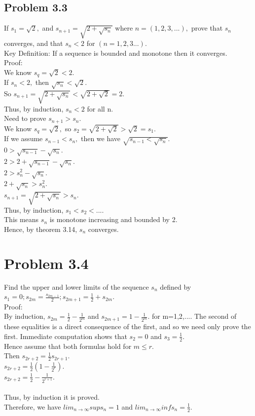 \subsection*{Problem 3.3}
If $s_1=\sqrt{2},$ and $s_{n+1}=\sqrt{2+\sqrt{s_n}}$ where $n=(1,2,3,...),$ prove that ${s_n}$ converges, and that $s_n<2$ for $(n=1,2,3...).$\\ 
Key Definition: If a sequence is bounded and monotone then it converges.\\ 
Proof: \\ 
We know $s_q=\sqrt{2}<2.$\\ 
If $s_n<2,$ then $\sqrt{s_n}<\sqrt{2}.$ \\ 
So $s_{n+1}=\sqrt{2+\sqrt{s_n}}<\sqrt{2+\sqrt{2}}=2.$\\ 
Thus, by induction, $s_n<2$ for all n. \\ 
Need to prove $s_{n+1}>s_n$. \\ 
We know $s_q=\sqrt{2},$ so $s_2=\sqrt{2+\sqrt{2}}>\sqrt{2}=s_1.$\\ 
If we assume $s_{n-1}<s_n,$ then we have $\sqrt{s_{n-1}<\sqrt{s_n}}.$\\ 
$0>\sqrt{s_{n-1}}-\sqrt{s_n}.$\\ $2>2+\sqrt{s_{n-1}}-\sqrt{s_n}.$\\ 
$2>s_{n}^2-\sqrt{s_n}.$\\ 
$2+\sqrt{s_n}>s_{n}^2. $\\ 
$s_{n+1}=\sqrt{2+\sqrt{s_n}}>s_n.$\\ 
Thus, by induction, $s_1<s_2<....$ \\ 
This means ${s_n}$ is monotone increasing and bounded by 2. \\
Hence, by theorem 3.14, ${s_n}$ converges.
\section*{Problem 3.4}
Find the upper and lower limits of the sequence ${s_n}$ defined by $s_1=0; s_{2m}=\frac{s_{2m-1}}{2}; s_{2m+1}=\frac{1}{2}+s_{2m}.$\\ 
Proof: \\ 
By induction, $s_{2m}=\frac{1}{2}-\frac{1}{2^m}$ and $s_{2m+1}=1-\frac{1}{2^m}.$ for m=1,2,.... The second of these equalities is a direct consequence of the first, and so we need only prove the first. Immediate computation shows that $s_2=0$ and $s_3=\frac{1}{2}.$ \\ 
Hence assume that both formulas hold for $m \leq r.$\\ 
Then $s_{2r+2}=\frac{1}{2}s_{2r+1}.$\\ 
$s_{2r+2}=\frac{1}{2}(1-\frac{1}{2^r}).$\\
$s_{2r+2}=\frac{1}{2}-\frac{1}{2^{r+1}}.$\\\\ 
Thus, by induction it is proved. \\ 
Therefore, we have $lim_{n \rightarrow \infty}sup s_n=1$ and $lim_{n \rightarrow \infty}inf s_n=\frac{1}{2}.$
